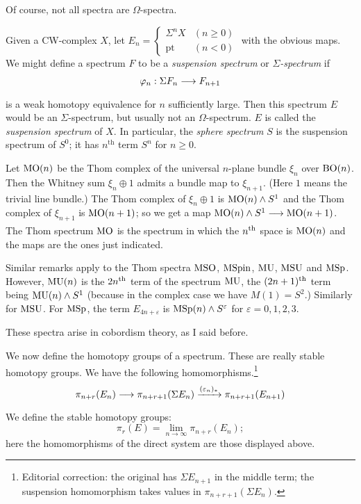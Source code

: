\documentclass[../main]{subfiles}
\begin{document}
Of course, not all spectra are $\Omega$-spectra.

\begin{example} \label{ex:p3ch02.3}
Given a CW-complex $X$, let 
$
E_n
=
\begin{cases}
\Sigma  ^nX        &(n\geq 0) \\
\mathrm{pt} &(n<0)
\end{cases}
$
 with the obvious maps. We might define a spectrum $F$ to be a \emph{suspension spectrum} or \emph{$\Sigma$-spectrum} if
\[
\varphi_n: \Sigma   F_n \lar{} F_{n+1}
\]
is a weak homotopy equivalence for $n$ sufficiently large. Then this spectrum $E$ would be an $\Sigma$-spectrum, but usually not an $\Omega$-spectrum. $E$ is called the \emph{suspension spectrum} of $X$. In particular, the \emph{sphere spectrum} $S$ is the suspension spectrum of $S^0$; it has $n^{\text{th}}$ term $S^n$ for $n\geq 0$.
\end{example}

\begin{example} \label{ex:p3ch02.4}
Let $\mathrm{MO}(n)$ be the Thom complex of the universal $n$-plane bundle $\xi_n$ over $\mathrm{BO}(n)$. Then the Whitney sum $\xi_n \oplus 1$ admits a bundle map to $\xi_{n+1}$. (Here $1$ means the trivial line bundle.) The Thom complex of $\xi_n \oplus 1$ is $\mathrm{MO}(n) \wedge S^1$ and the Thom complex of $\xi_{n+1}$ is $\mathrm{MO}(n+1)$; so we get a map $\te{MO}(n)\wedge S^1 \lar{} \te{MO}(n+1)$. The Thom spectrum $\mathrm{MO}$ is the spectrum in which the $n^{\text{th}}$ space is $\mathrm{MO}(n)$ and the maps are the ones just indicated. 

Similar remarks apply to the Thom spectra $\mathrm{MSO}$, $\mathrm{MSpin}$, $\mathrm{MU}$, $\mathrm{MSU}$ and $\mathrm{MSp}$. However, $\mathrm{MU}(n)$ is the $2n^{\text{th}}$ term of the spectrum $\mathrm{MU}$, the $(2n+1)^{\text{th}}$ term being $\mathrm{MU}(n)\wedge S^1$ (because in the complex case we have $M(1)=S^2$.) Similarly for $\mathrm{MSU}$. For $\mathrm{MSp}$, the term $E_{4n+\varepsilon}$ is $\mathrm{MSp}(n)\wedge S^\varepsilon$ for $\varepsilon=0,1,2,3$. 
\end{example}

These spectra arise in cobordism theory, as I said before.

We now define the homotopy groups of a spectrum. These are really stable homotopy groups. We have the following homomorphisms.\footnote{Editorial correction: the original has $\Sigma E_{n+1}$ in the middle term; the suspension homomorphism takes values in $\pi_{n+r+1}(\Sigma E_n)$.}
\[
\pi_{n+r}(E_n)
\lar{}
\pi_{n+r+1}(\Sigma E_n)
\vra{(\varepsilon_n)_\ast}
\pi_{n+r+1}(E_{n+1})
\]
We define the stable homotopy groups: 
\[
\pi_r(E) = \lim_{n\to \infty} \pi_{n+r}(E_n);
\]
here the homomorphisms of the direct system are those displayed above.
\end{document}
